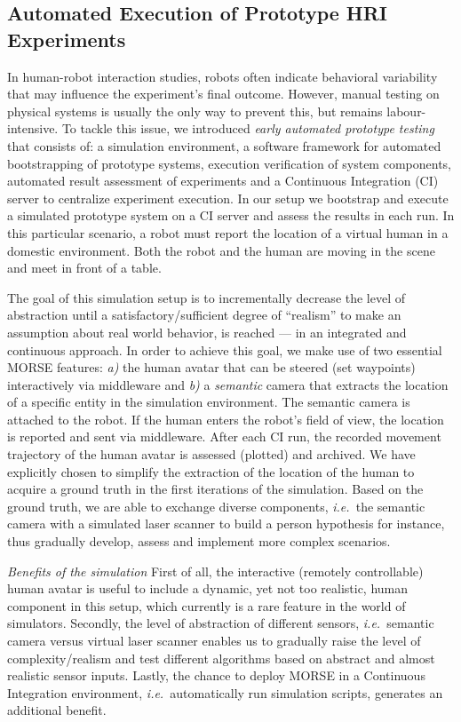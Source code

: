 \documentclass{llncs}
\newcommand{\ie}{{\textit{i.e.~}}}
\begin{document}
\subsection{Automated Execution of Prototype HRI Experiments}
\label{sc:ci}

In human-robot interaction studies, robots often indicate behavioral variability
that may influence the experiment's final outcome.  However, manual testing on
physical systems is usually the only way to prevent this, but remains
labour-intensive. To tackle this issue, we introduced \emph{early automated
prototype testing}~\cite{2645922} that consists of: a simulation environment, a
software framework for automated bootstrapping of prototype systems, execution
verification of system components, automated result assessment of experiments
and a Continuous Integration (CI) server to centralize experiment execution. In
our setup we bootstrap and execute a simulated prototype system on a CI server
and assess the results in each run. In this particular scenario, a robot must
report the location of a virtual human in a domestic environment. Both the
robot and the human are moving in the scene and meet in front of a table.


The goal of this simulation setup is to incrementally decrease the level of
abstraction until a satisfactory/sufficient degree of ``realism'' to make an
assumption about real world behavior, is reached --- in an integrated and
continuous approach. In order to achieve this goal, we make use of two essential
MORSE features: \textit{a)} the human avatar that can be steered (set waypoints)
interactively via middleware and \textit{b)} a \emph{semantic} camera that
extracts the location of a specific entity in the simulation environment.  The
semantic camera is attached to the robot. If the human enters the robot's field
of view, the location is reported and sent via middleware. After each CI run,
the recorded movement trajectory of the human avatar is assessed (plotted) and
archived. We have explicitly chosen to simplify the extraction of the location
of the human to acquire a ground truth in the first iterations of the
simulation. Based on the ground truth, we are able to exchange diverse
components, \ie the semantic camera with a simulated laser scanner to build a
person hypothesis for instance, thus gradually develop, assess and implement
more complex scenarios. 

\emph{Benefits of the simulation} First of all, the interactive (remotely
controllable) human avatar is useful to include a dynamic, yet not too
realistic, human component in this setup, which currently is a rare feature in
the world of simulators. Secondly, the level of abstraction of different
sensors, \ie semantic camera versus virtual laser scanner enables us to
gradually raise the level of complexity/realism and test different algorithms
based on abstract and almost realistic sensor inputs.  Lastly, the chance to
deploy MORSE in a Continuous Integration environment, \ie automatically run
simulation scripts, generates an additional benefit.
 
\end{document}
